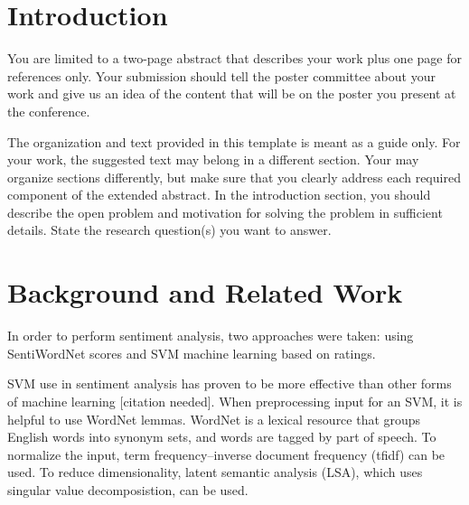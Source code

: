 \documentclass{acm_proc_article-sp}
\begin{document}

\maketitle

\section{Introduction}
You are limited to a two-page abstract that describes your work plus one page for references only.  Your submission should tell the poster committee about your work and give us an idea of the content that will be on the poster you present at the conference.

The organization and text provided in this template is meant as a guide only.  For your work, the suggested text may belong in a different section.  Your may organize sections differently, but make sure that you clearly address each required component of the extended abstract.
In the introduction section, you should describe the open problem and motivation for solving the problem in sufficient details.   State the research question(s) you want to answer.

\section{Background and Related Work}

In order to perform sentiment analysis, two approaches were taken: using SentiWordNet scores and SVM machine learning based on ratings.

SVM use in sentiment analysis has proven to be more effective than other forms of machine learning [citation needed].  When preprocessing input for an SVM, it is helpful to use WordNet lemmas.  WordNet is a lexical resource that groups English words into synonym sets, and words are tagged by part of speech.  To normalize the input, term frequency–inverse document frequency (tfidf) can be used.  To reduce dimensionality, latent semantic analysis (LSA), which uses singular value decomposistion, can be used.
\end{document}
